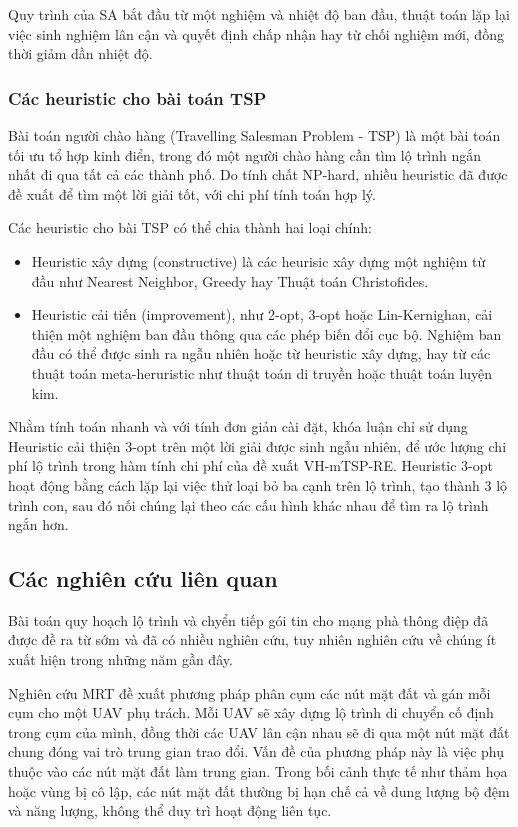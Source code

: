 \documentclass[a4paper]{article}
\begin{document}
Quy trình của SA bắt đầu từ một nghiệm và nhiệt độ ban đầu, thuật toán lặp lại việc sinh nghiệm lân cận và quyết định chấp nhận hay từ chối nghiệm mới, đồng thời giảm dần nhiệt độ. 

\subsubsection{Các heuristic cho bài toán TSP}
Bài toán người chào hàng (Travelling Salesman Problem - TSP) là một bài toán tối ưu tổ hợp kinh điển, trong đó một người chào hàng cần tìm lộ trình ngắn nhất đi qua tất cả các thành phố. Do tính chất NP-hard, nhiều heuristic đã được đề xuất để tìm một lời giải tốt, với chi phí tính toán hợp lý.

Các heuristic cho bài TSP có thể chia thành hai loại chính: 
\begin{itemize}
  \item Heuristic xây dựng (constructive) là các heurisic xây dựng một nghiệm từ đầu như Nearest Neighbor, Greedy hay Thuật toán Christofides.
  \item Heuristic cải tiến (improvement), như 2-opt, 3-opt hoặc Lin-Kernighan, cải thiện một nghiệm ban đầu thông qua các phép biến đổi cục bộ. Nghiệm ban đầu có thể được sinh ra ngẫu nhiên hoặc từ heuristic xây dựng, hay từ các thuật toán meta-heruristic như thuật toán di truyền hoặc thuật toán luyện kim.
\end{itemize}

Nhằm tính toán nhanh và với tính đơn giản cài đặt, khóa luận chỉ sử dụng Heuristic cải thiện 3-opt trên một lời giải được sinh ngẫu nhiên, để ước lượng chi phí lộ trình trong hàm tính chi phí của đề xuất VH-mTSP-RE. 
Heuristic 3-opt hoạt động bằng cách lặp lại việc thử loại bỏ ba cạnh trên lộ trình, tạo thành 3 lộ trình con, sau đó nối chúng lại theo các cấu hình khác nhau để tìm ra lộ trình ngắn hơn.

\subsection{Các nghiên cứu liên quan}
Bài toán quy hoạch lộ trình và chyển tiếp gói tin cho mạng phà thông điệp đã được đề ra từ sớm và đã có nhiều nghiên cứu, tuy nhiên nghiên cứu về chúng ít xuất hiện trong những năm gần đây.

Nghiên cứu MRT \cite{mrt} đề xuất phương pháp phân cụm các nút mặt đất và gán mỗi cụm cho một UAV phụ trách. Mỗi UAV sẽ xây dựng lộ trình di chuyển cố định trong cụm của mình, đồng thời các UAV lân cận nhau sẽ đi qua một nút mặt đất chung đóng vai trò trung gian trao đổi.
Vấn đề của phương pháp này là việc phụ thuộc vào các nút mặt đất làm trung gian. Trong bối cảnh thực tế như thảm họa hoặc vùng bị cô lập, các nút mặt đất thường bị hạn chế cả về dung lượng bộ đệm và năng lượng, không thể duy trì hoạt động liên tục. 
\end{document}
